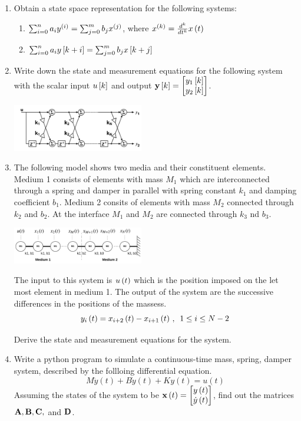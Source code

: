 \documentclass[9pt]{article}
\def\mf{\ensuremath\mathbf}
\def\lp{\ensuremath\left(}
\def\rp{\ensuremath\right)}
\def\ls{\ensuremath\left[}
\def\rs{\ensuremath\right]}
\def\bmx{\ensuremath\begin{bmatrix*}[r]}
\def\emx{\ensuremath\end{bmatrix*}}
\newcommand{\ct}[1]{\lp #1\rp}
\newcommand{\dt}[1]{\ls #1\rs}
\begin{document}
\begin{multicols}{2}
\begin{enumerate}[resume]
    \item Obtain a state space representation for the following systems:
    \begin{enumerate}
        \item $\sum_{i=0}^n a_iy^{\ct{i}} = \sum_{j=0}^m b_jx^{\ct{j}}$, where $x^{\ct{k}} = \frac{d^k}{dt^k}x\ct{t}$
        \item $\sum_{i=0}^n a_iy\dt{k+i} = \sum_{j=0}^m b_jx\dt{k+j}$
    \end{enumerate}

    \item Write down the state and measurement equations for the following system with the scalar input $u\dt{k}$ and output $\mf{y}\dt{k} = \bmx y_1\dt{k}\\ y_2\dt{k}\emx$. 

    \includegraphics[width=0.45\textwidth]{../figs/latticefilt.png}

    \item The following model shows two media and their constituent elements. Medium 1 consists of elements with mass $M_1$ which are interconnected through a spring and damper in parallel with spring constant $k_1$ and damping coefficient $b_1$. Medium 2 consits of elements with mass $M_2$ connected through $k_2$ and $b_2$. At the interface $M_1$ and $M_2$ are connected through $k_3$ nd $b_3$.

    \includegraphics[width=0.45\textwidth]{../figs/wavetx.png}    

    The input to this system is $u\ct{t}$ which is the position imposed on the let most element in medium 1. The output of the system are the successive differences in the positions of the massess.
    \[ y_i\ct{t} = x_{i+2}\ct{t} - x_{i+1}\ct{t} \, ,\,\,\, 1 \leq i \leq N-2 \]

    Derive the state and measurement equations for the system.

    \item Write a python program to simulate a continuous-time mass, spring, damper system, described by the follloing differential equation.
    \[ M \ddot{y}(t) + B\dot{y}(t) + K y(t) = u(t) \]
    Assuming the states of the system to be $\mf{x}\lp t \rp = \bmx y\lp t \rp \\ \dot{y}\lp t \rp \emx$, find out the matrices $\mf{A}, \mf{B}, \mf{C}, $ and $\mf{D}$.


\end{enumerate}
\end{multicols}
\end{document}
